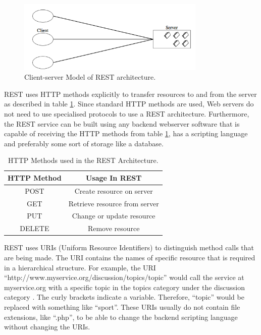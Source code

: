 \begin{figure}
  \centering
  	\caption{Client-server Model of REST architecture\cite{Fielding2000}.} 
    \includegraphics[width=0.8\textwidth]{figs/rest_client_server.png}
   
   \label{fig:rest_client_server}
\end{figure}

REST uses HTTP methods explicitly \cite{IBM} to transfer resources to and from the server as described in table \ref{tbl:rest_methods}. Since standard HTTP methods are used, Web servers do not need to use specialised protocols to use a REST architecture. Furthermore, the REST service can be built using any backend webserver software that is capable of receiving the HTTP methods from table \ref{tbl:rest_methods}, has a scripting language and preferably some sort of storage like a database.

\begin{table}
	\begin{center}
		\caption{HTTP Methods used in the REST Architecture\cite{IBM}.} 
		\begin{tabular}	{ | c | c |}
		\hline
		\textbf{HTTP Method} & \textbf{Usage In REST} \\ \hline
		POST & Create resource on server \\ \hline
		GET & Retrieve resource from server \\ \hline
		PUT & Change or update resource \\ \hline
		DELETE & Remove resource \\ \hline
		
	 
		\end{tabular}
		
		\label{tbl:rest_methods}
	\end{center}
\end{table}

REST uses URIs (Uniform Resource Identifiers) to distinguish method calls that are being made. The URI contains the names of specific resource that is required in a hierarchical structure. For example, the URI \\``http://www.myservice.org/discussion/topics/{topic}'' would call the service at myservice.org with a specific topic in the topics category under the discussion category \cite{IBM}. The curly brackets indicate a variable. Therefore, ``{topic}'' would be replaced with something like ``sport''. These URIs usually do not contain file extensions, like ``.php'', to be able to change the backend scripting language without changing the URIs. 

